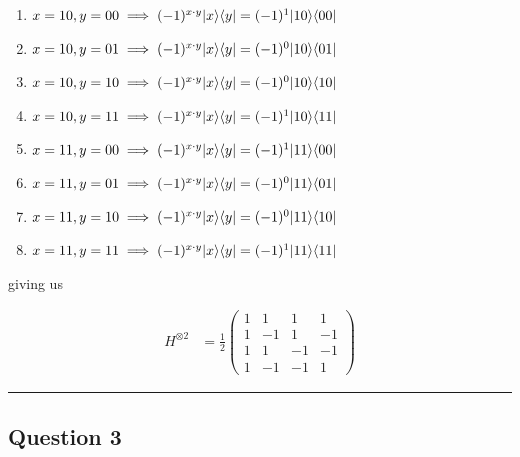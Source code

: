 \documentclass[11pt]{article}
\begin{document}
\begin{enumerate}[(a).]
\begin{enumerate}[1.]
    \item $x = 10, y = 00 \implies (-1)^{x \cdot y} \lvert x\rangle \langle y\rvert = (-1)^{1} \lvert10\rangle \langle00\rvert$
    \item $x = 10, y = 01 \implies (-1)^{x \cdot y} \lvert x\rangle \langle y\rvert = (-1)^{0} \lvert10\rangle \langle01\rvert$
    \item $x = 10, y = 10 \implies (-1)^{x \cdot y} \lvert x\rangle \langle y\rvert = (-1)^{0} \lvert10\rangle \langle10\rvert$
    \item $x = 10, y = 11 \implies (-1)^{x \cdot y} \lvert x\rangle \langle y\rvert = (-1)^{1} \lvert10\rangle \langle11\rvert$
    
    \item $x = 11, y = 00 \implies (-1)^{x \cdot y} \lvert x\rangle \langle y\rvert = (-1)^{1} \lvert11\rangle \langle00\rvert$
    \item $x = 11, y = 01 \implies (-1)^{x \cdot y} \lvert x\rangle \langle y\rvert = (-1)^{0} \lvert11\rangle \langle01\rvert$
    \item $x = 11, y = 10 \implies (-1)^{x \cdot y} \lvert x\rangle \langle y\rvert = (-1)^{0} \lvert11\rangle \langle10\rvert$
    \item $x = 11, y = 11 \implies (-1)^{x \cdot y} \lvert x\rangle \langle y\rvert = (-1)^{1} \lvert11\rangle \langle11\rvert$
  \end{enumerate}

  giving us

  \begin{align*}
    H^{\otimes 2} &= \frac{1}{2} \begin{pmatrix}
      1 & 1 & 1 & 1 \\
      1 & -1 & 1 & -1 \\
      1 & 1 & -1 & -1 \\
      1 & -1 & -1 & 1 
    \end{pmatrix}
  \end{align*}



\end{enumerate}

\vskip 1cm
\hrule
\pagebreak



\subsection*{Question 3}
\end{document}
